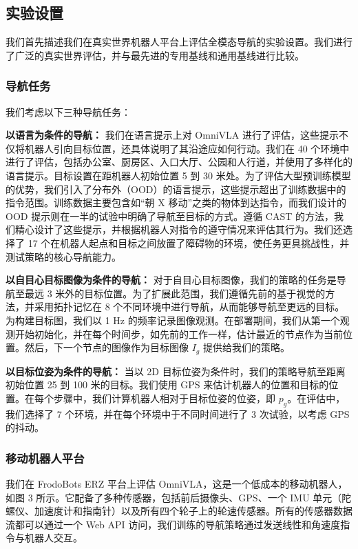 \subsection{实验设置}

我们首先描述我们在真实世界机器人平台上评估全模态导航的实验设置。我们进行了广泛的真实世界评估，并与最先进的专用基线和通用基线进行比较。

\subsubsection{导航任务}

我们考虑以下三种导航任务：

\textbf{以语言为条件的导航：} 我们在语言提示上对 OmniVLA 进行了评估，这些提示不仅将机器人引向目标位置，还具体说明了其沿途应如何行动。我们在 40 个环境中进行了评估，包括办公室、厨房区、入口大厅、公园和人行道，并使用了多样化的语言提示。目标设置在距机器人初始位置 5 到 30 米处。为了评估大型预训练模型的优势，我们引入了分布外（OOD）的语言提示，这些提示超出了训练数据中的指令范围。训练数据主要包含如“朝 X 移动”之类的物体到达指令，而我们设计的 OOD 提示则在一半的试验中明确了导航至目标的方式。遵循 CAST 的方法，我们精心设计了这些提示，并根据机器人对指令的遵守情况来评估其行为。我们还选择了 17 个在机器人起点和目标之间放置了障碍物的环境，使任务更具挑战性，并测试策略的核心导航能力。

\textbf{以自目心目标图像为条件的导航：} 对于自目心目标图像，我们的策略的任务是导航至最远 3 米外的目标位置。为了扩展此范围，我们遵循先前的基于视觉的方法，并采用拓扑记忆在 8 个不同环境中进行导航，从而能够导航至更远的目标。为构建目标图，我们以 1 Hz 的频率记录图像观测。在部署期间，我们从第一个观测开始初始化，并在每个时间步，如先前的工作一样，估计最近的节点作为当前位置。然后，下一个节点的图像作为目标图像 $I_g$ 提供给我们的策略。

\textbf{以目标位姿为条件的导航：} 当以 2D 目标位姿为条件时，我们的策略导航至距离初始位置 25 到 100 米的目标。我们使用 GPS 来估计机器人的位置和目标的位置。在每个步骤中，我们计算机器人相对于目标位姿的位姿，即 $p_g$。在评估中，我们选择了 7 个环境，并在每个环境中于不同时间进行了 3 次试验，以考虑 GPS 的抖动。

\subsubsection{移动机器人平台}

我们在 FrodoBots ERZ 平台上评估 OmniVLA，这是一个低成本的移动机器人，如图 3 所示。它配备了多种传感器，包括前后摄像头、GPS、一个 IMU 单元（陀螺仪、加速度计和指南针）以及所有四个轮子上的轮速传感器。所有的传感器数据流都可以通过一个 Web API 访问，我们训练的导航策略通过发送线性和角速度指令与机器人交互。


